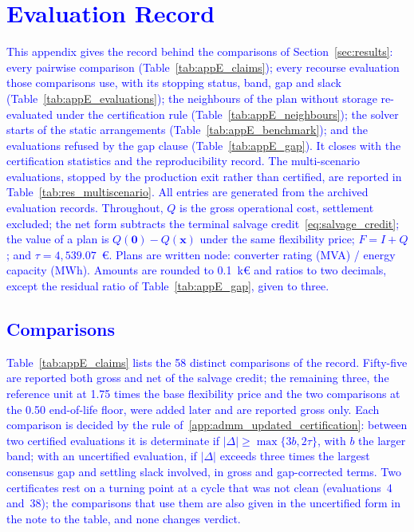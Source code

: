 \documentclass[preprint,12pt]{elsarticle}
\begin{document}
\section{\textcolor{blue}{Evaluation Record}}
\label{app:results}

\textcolor{blue}{
    This appendix gives the record behind the comparisons of Section~\ref{sec:results}: every pairwise comparison (Table~\ref{tab:appE_claims}); every recourse evaluation those comparisons use, with its stopping status, band, gap and slack (Table~\ref{tab:appE_evaluations}); the neighbours of the plan without storage re-evaluated under the certification rule (Table~\ref{tab:appE_neighbours}); the solver starts of the static arrangements (Table~\ref{tab:appE_benchmark}); and the evaluations refused by the gap clause (Table~\ref{tab:appE_gap}). It closes with the certification statistics and the reproducibility record. The multi-scenario evaluations, stopped by the production exit rather than certified, are reported in Table~\ref{tab:res_multiscenario}. All entries are generated from the archived evaluation records. Throughout, $Q$ is the gross operational cost, settlement excluded; the net form subtracts the terminal salvage credit~\eqref{eq:salvage_credit}; the value of a plan is $Q(\boldsymbol{0}) - Q(\boldsymbol{x})$ under the same flexibility price; $F = I + Q$; and $\tau = 4{,}539.07$~\euro{}. Plans are written node: converter rating (MVA) / energy capacity (MWh). Amounts are rounded to 0.1~k\euro{} and ratios to two decimals, except the residual ratio of Table~\ref{tab:appE_gap}, given to three.
}

\subsection{\textcolor{blue}{Comparisons}}
\label{app:results_claims}

\textcolor{blue}{
    Table~\ref{tab:appE_claims} lists the 58 distinct comparisons of the record. Fifty-five are reported both gross and net of the salvage credit; the remaining three, the reference unit at 1.75 times the base flexibility price and the two comparisons at the 0.50 end-of-life floor, were added later and are reported gross only. Each comparison is decided by the rule of~\ref{app:admm_updated_certification}: between two certified evaluations it is determinate if $|\Delta| \geq \max\{3b, 2\tau\}$, with $b$ the larger band; with an uncertified evaluation, if $|\Delta|$ exceeds three times the largest consensus gap and settling slack involved, in gross and gap-corrected terms. Two certificates rest on a turning point at a cycle that was not clean (evaluations~4 and~38); the comparisons that use them are also given in the uncertified form in the note to the table, and none changes verdict.
}
\end{document}
